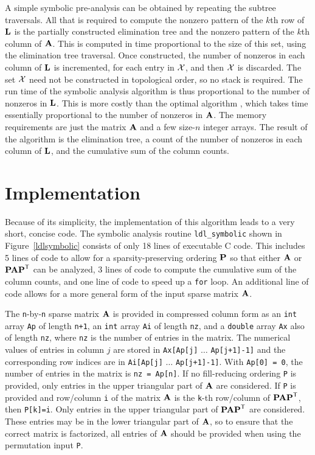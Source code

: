 \documentclass[12pt]{article}
\newcommand{\m}[1]{{\bf{#1}}}       %
\newcommand{\tr}{^{\sf T}}          %
\begin{document}
A simple symbolic pre-analysis can be obtained by repeating the subtree traversals.
All that is required to compute the nonzero pattern of
the $k$th row of $\m{L}$ is the partially constructed elimination tree
and the nonzero pattern of the $k$th column of $\m{A}$.  This is computed
in time proportional to the size of this set, using the elimination tree
traversal.  Once constructed, the number of nonzeros in each column of
$\m{L}$ is incremented, for each entry in ${\cal X}$, and then ${\cal X}$
is discarded.  The set ${\cal X}$ need not be constructed in topological
order, so no stack is required.  The run time of the symbolic analysis
algorithm is thus proportional to the number of nonzeros in $\m{L}$.
This is more costly than the optimal algorithm \cite{GilbertNgPeyton94},
which takes time essentially proportional to the number of nonzeros in $\m{A}$.
The memory requirements are just the matrix $\m{A}$ and a few size-$n$ integer
arrays.  The result of the algorithm is the elimination tree, a count
of the number of nonzeros in each column of $\m{L}$, and
the cumulative sum of the column counts.

\section{Implementation}
\label{Implementation}

Because of its simplicity, the implementation of this algorithm leads to
a very short, concise code.  The symbolic analysis routine {\tt ldl\_symbolic}
shown in Figure~\ref{ldlsymbolic}
consists of only 18 lines of executable C code.
This includes 5 lines of code to allow for a
sparsity-preserving ordering $\m{P}$ so that either $\m{A}$ or $\m{PAP}\tr$
can be analyzed, 3 lines of code to compute the cumulative sum of
the column counts, and one line of code to speed up a {\tt for} loop.
An additional line of code allows for a more general form of the input
sparse matrix $\m{A}$.

The {\tt n}-by-{\tt n} sparse matrix $\m{A}$ is provided in compressed column
form as an {\tt int} array {\tt Ap} of length {\tt n+1},
an {\tt int} array {\tt Ai} of length {\tt nz},
and a {\tt double} array {\tt Ax} also of length {\tt nz},
where {\tt nz} is the number of entries in the matrix.
The numerical values of entries in column $j$ are stored in
{\tt Ax[Ap[j]} $\ldots$ {\tt Ap[j+1]-1]}
and the corresponding row indices are in
{\tt Ai[Ap[j]} $\ldots$ {\tt Ap[j+1]-1]}.
With {\tt Ap[0] = 0}, the number of entries in the matrix is {\tt nz = Ap[n]}.
If no fill-reducing ordering {\tt P} is provided,
only entries in the upper triangular part of $\m{A}$ are considered.
If {\tt P} is provided and row/column {\tt i} of the
matrix $\m{A}$ is the {\tt k}-th row/column of $\m{PAP}\tr$, then {\tt P[k]=i}.
Only entries in the upper
triangular part of $\m{PAP}\tr$ are considered.  These entries may be
in the lower triangular part of $\m{A}$, so to ensure that the correct matrix
is factorized, all entries of $\m{A}$ should be provided when using the
permutation input {\tt P}.
\end{document}
